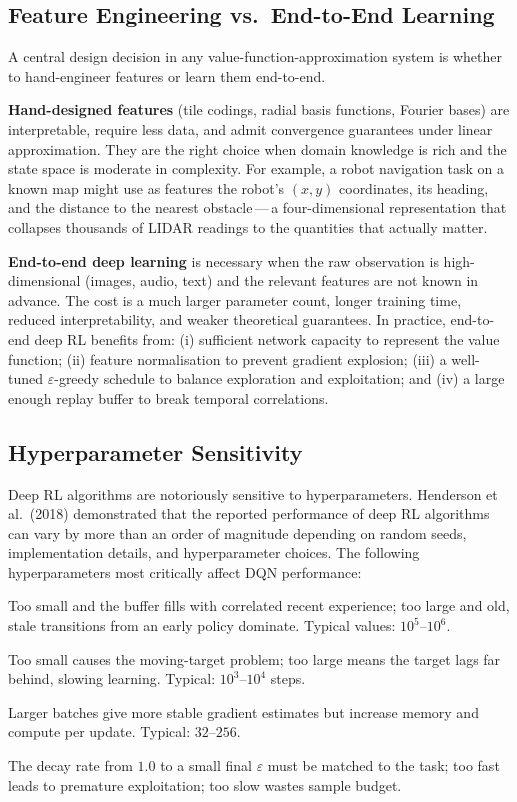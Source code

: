 \subsection{Feature Engineering vs.\ End-to-End Learning}

A central design decision in any value-function-approximation system is whether to hand-engineer
features or learn them end-to-end.

\textbf{Hand-designed features} (tile codings, radial basis functions, Fourier bases) are
interpretable, require less data, and admit convergence guarantees under linear approximation.
They are the right choice when domain knowledge is rich and the state space is moderate in
complexity.  For example, a robot navigation task on a known map might use as features the robot's
$(x, y)$ coordinates, its heading, and the distance to the nearest obstacle\,---\,a four-dimensional
representation that collapses thousands of LIDAR readings to the quantities that actually matter.

\textbf{End-to-end deep learning} is necessary when the raw observation is high-dimensional
(images, audio, text) and the relevant features are not known in advance.  The cost is a much
larger parameter count, longer training time, reduced interpretability, and weaker theoretical
guarantees.  In practice, end-to-end deep RL benefits from: (i) sufficient network capacity to
represent the value function; (ii) feature normalisation to prevent gradient explosion; (iii) a
well-tuned $\varepsilon$-greedy schedule to balance exploration and exploitation; and (iv) a large
enough replay buffer to break temporal correlations.

\subsection{Hyperparameter Sensitivity}

Deep RL algorithms are notoriously sensitive to hyperparameters.  Henderson et al.~(2018)
demonstrated that the reported performance of deep RL algorithms can vary by more than an order of
magnitude depending on random seeds, implementation details, and hyperparameter choices.
The following hyperparameters most critically affect DQN performance:
\begin{description}[leftmargin=!, labelwidth=3.5cm]
\item[Replay buffer size $N$:] Too small and the buffer fills with correlated recent experience;
  too large and old, stale transitions from an early policy dominate.  Typical values: $10^5$--$10^6$.
\item[Target update frequency $C$:] Too small causes the moving-target problem; too large means
  the target lags far behind, slowing learning.  Typical: $10^3$--$10^4$ steps.
\item[Batch size $B$:] Larger batches give more stable gradient estimates but increase memory
  and compute per update.  Typical: $32$--$256$.
\item[$\varepsilon$-schedule:] The decay rate from $1.0$ to a small final $\varepsilon$ must be
  matched to the task; too fast leads to premature exploitation; too slow wastes sample budget.
\end{description}

